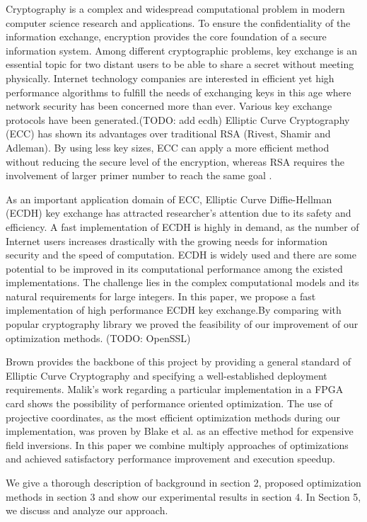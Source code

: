 Cryptography is a complex and widespread computational problem in modern computer science research and applications. To ensure the confidentiality of the information exchange, encryption provides the core foundation of a secure information system. Among different cryptographic problems, key exchange is an essential topic for two distant users to be able to share a secret without meeting physically. Internet technology companies are interested in efficient yet high performance algorithms to fulfill the needs of exchanging keys in this age where network security has been concerned more than ever. Various key exchange protocols have been generated.(TODO: add ecdh) Elliptic Curve Cryptography (ECC) has shown its advantages over traditional RSA (Rivest, Shamir and Adleman). By using less key sizes, ECC can apply a more efficient method without reducing the secure level of the encryption, whereas RSA requires the involvement of larger primer number to reach the same goal \cite{Malik:2010}. 

As an important application domain of ECC, Elliptic Curve Diffie-Hellman (ECDH) key exchange has attracted researcher's attention due to its safety and efficiency. A fast implementation of ECDH is highly in demand, as the number of Internet users increases drastically with the growing needs for information security and the speed of computation. ECDH is widely used and there are some potential to be improved in its computational performance among the existed implementations. The challenge lies in the complex computational models and its natural requirements for large integers. In this paper, we propose a fast implementation of high performance ECDH key exchange.By comparing with popular cryptography library we proved the feasibility of our improvement of our optimization methods.  (TODO: OpenSSL)

Brown provides the backbone of this project by providing a general standard of Elliptic Curve Cryptography\cite{Brown:2009} and specifying a well-established deployment requirements. Malik's work regarding a particular implementation in a FPGA card \cite{Malik:2010} shows the possibility of performance oriented optimization. The use of projective coordinates, as the most efficient optimization methods during our implementation, was proven by Blake et al.\cite{Blake:1999} as an effective method for expensive field inversions. In this paper we combine multiply approaches of optimizations and achieved satisfactory performance improvement and execution speedup.  

We give a thorough description of background in section 2, proposed optimization methods in section 3 and show our experimental results in section 4. In Section 5, we discuss and analyze our approach.